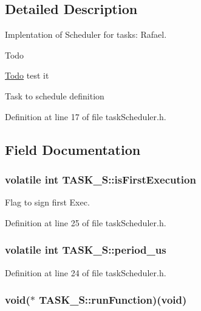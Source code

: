 \subsection{Detailed Description}
Implentation of Scheduler for tasks\-:  Rafael. 

\begin{DoxyRefDesc}{Todo}
\item[\hyperlink{todo__todo000004}{Todo}]test it \end{DoxyRefDesc}
Task to schedule definition 

Definition at line 17 of file task\-Scheduler.\-h.



\subsection{Field Documentation}
\hypertarget{structTASK__S_a4b50404ee955691f1c62845cdc9de676}{
\subsubsection[{is\-First\-Execution}]{\setlength{\rightskip}{0pt plus 5cm}volatile int T\-A\-S\-K\-\_\-\-S\-::is\-First\-Execution}}\label{structTASK__S_a4b50404ee955691f1c62845cdc9de676}


Flag to sign first Exec. 



Definition at line 25 of file task\-Scheduler.\-h.

\hypertarget{structTASK__S_aabd8f80831e6cfd8e51bbd371eed907b}{
\subsubsection[{period\-\_\-us}]{\setlength{\rightskip}{0pt plus 5cm}volatile int T\-A\-S\-K\-\_\-\-S\-::period\-\_\-us}}\label{structTASK__S_aabd8f80831e6cfd8e51bbd371eed907b}


Definition at line 24 of file task\-Scheduler.\-h.

\hypertarget{structTASK__S_a241d427891bed303812b78bd9f9ad86f}{
\subsubsection[{run\-Function}]{\setlength{\rightskip}{0pt plus 5cm}void($\ast$ T\-A\-S\-K\-\_\-\-S\-::run\-Function)(void)}}\label{structTASK__S_a241d427891bed303812b78bd9f9ad86f}


